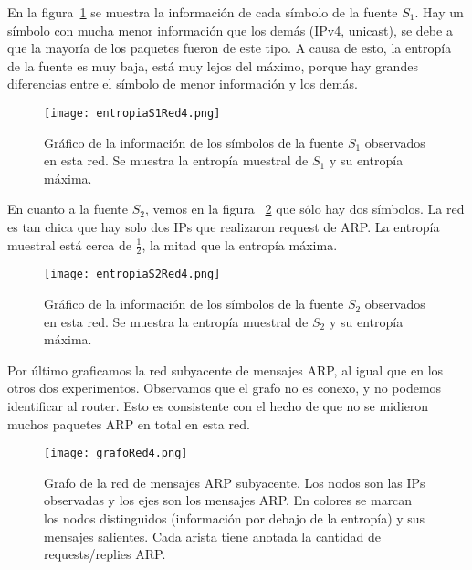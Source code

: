 En la figura~\ref{entropias1_4} se muestra la información de cada símbolo de la fuente $S_1$. Hay un símbolo con mucha menor información que los demás (IPv4, unicast), se debe a que la mayoría de los paquetes fueron de este tipo. A causa de esto, la entropía de la fuente es muy baja, está muy lejos del máximo, porque hay grandes diferencias entre el símbolo de menor información y los demás.

\begin{figure}[H]
\centering
\texttt{[image: entropiaS1Red4.png]}
\caption{Gráfico de la información de los símbolos de la fuente $S_1$ observados en esta red. Se muestra la entropía muestral de $S_1$ y su entropía máxima.}
\label{entropias1_4}
\end{figure}

En cuanto a la fuente $S_2$, vemos en la figura ~\ref{entropias2_4} que sólo hay dos símbolos. La red es tan chica que hay solo dos IPs que realizaron request de ARP. La entropía muestral está cerca de $\frac{1}{2}$, la mitad que la entropía máxima.

\begin{figure}[H]
\centering
\texttt{[image: entropiaS2Red4.png]}
\caption{Gráfico de la información de los símbolos de la fuente $S_2$ observados en esta red. Se muestra la entropía muestral de $S_2$ y su entropía máxima.}
\label{entropias2_4}
\end{figure}

Por último graficamos la red subyacente de mensajes ARP, al igual que en los otros dos experimentos. Observamos que el grafo no es conexo, y no podemos identificar al router. Esto es consistente con el hecho de que no se midieron muchos paquetes ARP en total en esta red.

\begin{figure}[H]
\centering
\texttt{[image: grafoRed4.png]}
\caption{Grafo de la red de mensajes ARP subyacente. Los nodos son las IPs observadas y los ejes son los mensajes ARP. En colores se marcan los nodos distinguidos (información por debajo de la entropía) y sus mensajes salientes. Cada arista tiene anotada la cantidad de requests/replies ARP.}
\label{grafo4}
\end{figure}

